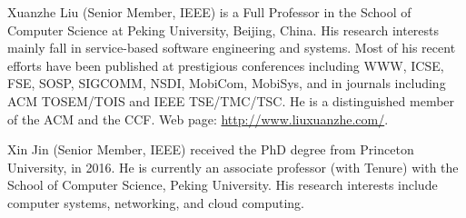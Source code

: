 \begin{IEEEbiography}{Xuanzhe Liu}
(Senior Member, IEEE) is a  Full {P}rofessor in the School of Computer Science {at} Peking University, {{ Beijing, China}. 
His research interests mainly fall in service-based software engineering and systems.
{Most of his recent efforts have been published at prestigious conferences including WWW, ICSE, FSE, SOSP, SIGCOMM, NSDI, MobiCom, MobiSys, and in journals including ACM TOSEM/TOIS and IEEE TSE/TMC/TSC. 
He is a distinguished member of the ACM and the CCF. Web page: \url{http://www.liuxuanzhe.com/}}}.
\end{IEEEbiography}

\vspace{-15pt}

\begin{IEEEbiography}{Xin Jin}
(Senior Member, IEEE) received the PhD degree from Princeton University, in 2016. He is currently an associate professor (with Tenure) with the School of Computer Science, Peking University. His research interests include computer systems, networking, and cloud computing.
\end{IEEEbiography}
  
